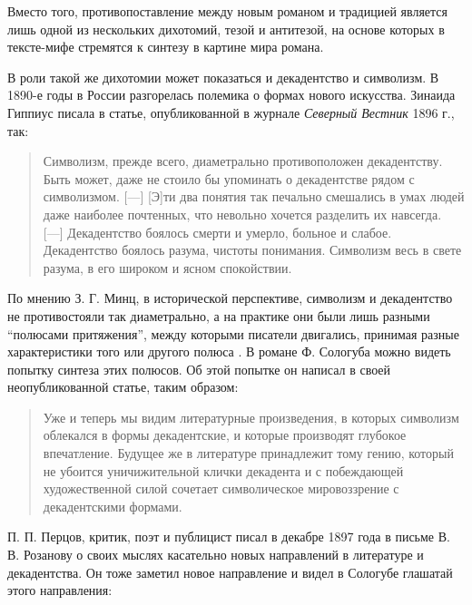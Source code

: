 \documentclass[12pt,a4paper]{article}
\begin{document}
Вместо того, противопоставление между новым романом и традицией является лишь одной из нескольких дихотомий, тезой и антитезой, на основе которых в тексте-мифе стремятся к синтезу в картине мира романа.

В роли такой же дихотомии может показаться и декадентство и символизм. В 1890-е годы в России разгорелась полемика о формах нового искусства. Зинаида Гиппиус писала в статье, опубликованной в журнале \emph{Северный Вестник} 1896 г., так:

\begin{quote}
Символизм, прежде всего, диаметрально противоположен декадентству. Быть может, даже не стоило бы упоминать о декадентстве рядом с символизмом. [---] [Э]ти два понятия так печально смешались в умах людей даже наиболее почтенных, что невольно хочется разделить их навсегда. [---] Декадентство боялось смерти и умерло, больное и слабое. Декадентство боялось разума, чистоты понимания. Символизм весь в свете разума, в его широком и ясном спокойствии.

\Parencite[235--246.]{gippius1896}


\end{quote}

По мнению З. Г. Минц, в исторической перспективе, символизм и декадентство не противостояли так диаметрально, а на практике они были лишь разными \enquote{полюсами притяжения}, между которыми писатели двигались, принимая разные характеристики того или другого полюса \parencite[62]{mints2004}. В романе Ф. Сологуба можно видеть попытку синтеза этих полюсов. Об этой попытке он написал в своей неопубликованной статье, таким образом:

\begin{quote}
Уже и теперь мы видим литературные произведения, в которых символизм облекался в формы декадентские, и которые производят глубокое впечатление. Будущее же в литературе принадлежит тому гению, который не убоится уничижительной клички декадента и с побеждающей художественной силой сочетает символическое мировоззрение с декадентскими формами.

\parencite[501.]{ref:sologub2007}
\end{quote}

П. П. Перцов, критик, поэт и публицист писал в декабре 1897 года в письме В. В. Розанову о своих мыслях касательно новых направлений в литературе и декадентства. Он тоже заметил новое направление и видел в Сологубе глашатай этого направления:
\end{document}
